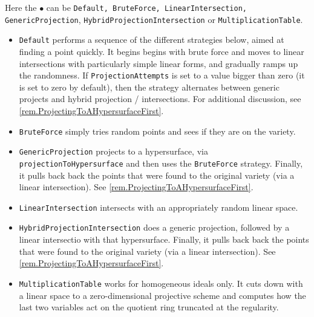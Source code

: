 \documentclass[11pt]{amsart}
\theoremstyle{definition}
\begin{document}
    \begin{description}%
        \setlength{\itemsep}{5pt}
    \item[\tt Strategy => $\bullet$]   Here the $\bullet$ can be {\tt Default, BruteForce, LinearIntersection, \\ GenericProjection}, {\tt HybridProjectionIntersection} or {\tt MultiplicationTable}.

    \begin{itemize}
    \item {\tt Default} performs a sequence of the different strategies below, aimed at finding a point quickly.  It begins begins with brute force and moves to linear intersections with particularly simple linear forms, and gradually ramps up the randomness.  If {\tt ProjectionAttempts} is set to a value bigger than zero (it is set to zero by default), then the strategy alternates between generic projects and hybrid projection / intersections.  For additional discussion, see \cref{rem.ProjectingToAHypersurfaceFirst}.  
    \item {\tt BruteForce} simply tries random points and sees if they are on the variety.
        
    \item {\tt GenericProjection} projects to a hypersurface, via 
        {\tt projectionToHypersurface} and then uses the {\tt BruteForce} strategy.  Finally, it pulls back back the points that were found to the original variety (via a linear intersection).  See \cref{rem.ProjectingToAHypersurfaceFirst}.  
        
    \item {\tt LinearIntersection} intersects with an appropriately random linear space.
        
    \item {\tt HybridProjectionIntersection} does a generic projection, followed by a linear intersectio with that hypersurface.  Finally, it pulls back back the points that were found to the original variety (via a linear intersection).   See \cref{rem.ProjectingToAHypersurfaceFirst}.  
    \item {\tt MultiplicationTable} works for homogeneous ideals only. It cuts down with a linear space to a zero-dimensional projective scheme and computes how the last two variables act on the quotient ring truncated at the regularity.  %
    \end{itemize}


\end{description}
\end{document}

